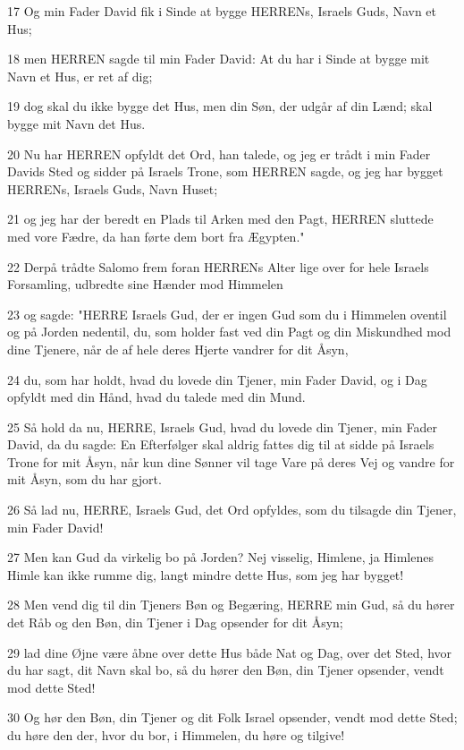 \par 17 Og min Fader David fik i Sinde at bygge HERRENs, Israels Guds, Navn et Hus;
\par 18 men HERREN sagde til min Fader David: At du har i Sinde at bygge mit Navn et Hus, er ret af dig;
\par 19 dog skal du ikke bygge det Hus, men din Søn, der udgår af din Lænd; skal bygge mit Navn det Hus.
\par 20 Nu har HERREN opfyldt det Ord, han talede, og jeg er trådt i min Fader Davids Sted og sidder på Israels Trone, som HERREN sagde, og jeg har bygget HERRENs, Israels Guds, Navn Huset;
\par 21 og jeg har der beredt en Plads til Arken med den Pagt, HERREN sluttede med vore Fædre, da han førte dem bort fra Ægypten."
\par 22 Derpå trådte Salomo frem foran HERRENs Alter lige over for hele Israels Forsamling, udbredte sine Hænder mod Himmelen
\par 23 og sagde: "HERRE Israels Gud, der er ingen Gud som du i Himmelen oventil og på Jorden nedentil, du, som holder fast ved din Pagt og din Miskundhed mod dine Tjenere, når de af hele deres Hjerte vandrer for dit Åsyn,
\par 24 du, som har holdt, hvad du lovede din Tjener, min Fader David, og i Dag opfyldt med din Hånd, hvad du talede med din Mund.
\par 25 Så hold da nu, HERRE, Israels Gud, hvad du lovede din Tjener, min Fader David, da du sagde: En Efterfølger skal aldrig fattes dig til at sidde på Israels Trone for mit Åsyn, når kun dine Sønner vil tage Vare på deres Vej og vandre for mit Åsyn, som du har gjort.
\par 26 Så lad nu, HERRE, Israels Gud, det Ord opfyldes, som du tilsagde din Tjener, min Fader David!
\par 27 Men kan Gud da virkelig bo på Jorden? Nej visselig, Himlene, ja Himlenes Himle kan ikke rumme dig, langt mindre dette Hus, som jeg har bygget!
\par 28 Men vend dig til din Tjeners Bøn og Begæring, HERRE min Gud, så du hører det Råb og den Bøn, din Tjener i Dag opsender for dit Åsyn;
\par 29 lad dine Øjne være åbne over dette Hus både Nat og Dag, over det Sted, hvor du har sagt, dit Navn skal bo, så du hører den Bøn, din Tjener opsender, vendt mod dette Sted!
\par 30 Og hør den Bøn, din Tjener og dit Folk Israel opsender, vendt mod dette Sted; du høre den der, hvor du bor, i Himmelen, du høre og tilgive!
